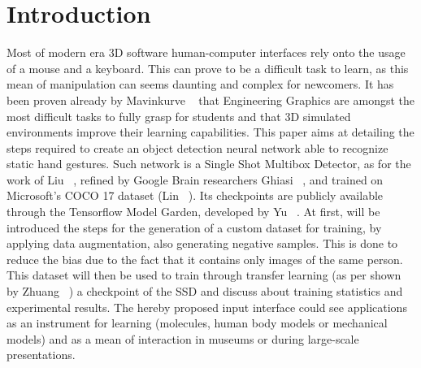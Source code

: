 \documentclass[10pt,twocolumn,letterpaper]{article}
\begin{document}
\section{Introduction}
\begin{flushleft}
Most of modern era 3D software human-computer interfaces rely onto the usage of a mouse and a keyboard. This can prove to be a difficult task to learn, as this mean of manipulation can seems daunting and complex for newcomers.\linebreak
It has been proven already by Mavinkurve \etal~\cite{7814839} that Engineering Graphics are amongst the most difficult tasks to fully grasp for students and that 3D simulated environments improve their learning capabilities.\linebreak
This paper aims at detailing the steps required to create an object detection neural network able to recognize static hand gestures. Such network is a Single Shot Multibox Detector, as for the work of Liu \etal~\cite{ssd}, refined by Google Brain researchers Ghiasi \etal~\cite{ghiasi2019nasfpn}, and trained on Microsoft's COCO 17 dataset (Lin \etal~\cite{lin2015microsoft}). Its checkpoints are publicly available through the Tensorflow Model Garden, developed by Yu \etal~\cite{tensorflowmodelgarden2020}.\linebreak
At first, will be introduced the steps for the generation of a custom dataset for training, by applying data augmentation, also generating negative samples. This is done to reduce the bias due to the fact that it contains only images of the same person. This dataset will then be used to train through transfer learning (as per shown by Zhuang \etal~\cite{zhuang2020comprehensive}) a checkpoint of the SSD and discuss about training statistics and experimental results.\linebreak
The hereby proposed input interface could see applications as an instrument for learning (molecules, human body models or mechanical models) and as a mean of interaction in museums or during large-scale presentations.
\end{flushleft}
\end{document}
